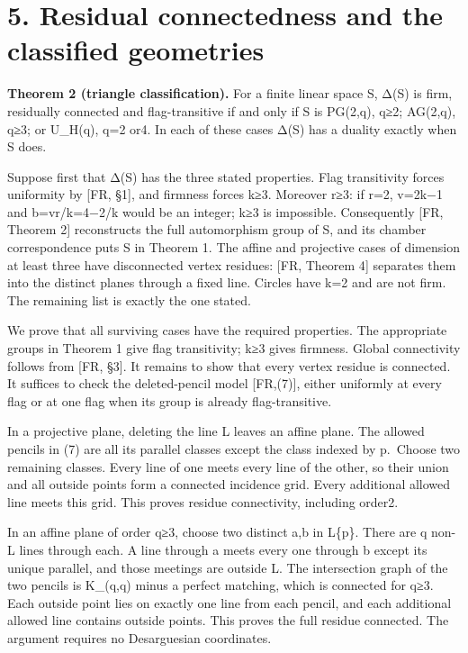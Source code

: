 \documentclass[
  11pt,
  a4paper,
]{article}
\begin{document}
\section{5. Residual connectedness and the classified
geometries}\label{residual-connectedness-and-the-classified-geometries}

\textbf{Theorem 2 (triangle classification).} For a finite linear space
S, Δ(S) is firm, residually connected and flag-transitive if and only if
S is PG(2,q), q≥2; AG(2,q), q≥3; or U\_H(q), q=2 or4. In each of these
cases Δ(S) has a duality exactly when S does.

Suppose first that Δ(S) has the three stated properties. Flag
transitivity forces uniformity by {[}FR, §1{]}, and firmness forces k≥3.
Moreover r≥3: if r=2, v=2k−1 and b=vr/k=4−2/k would be an integer; k≥3
is impossible. Consequently {[}FR, Theorem 2{]} reconstructs the full
automorphism group of S, and its chamber correspondence puts S in
Theorem 1. The affine and projective cases of dimension at least three
have disconnected vertex residues: {[}FR, Theorem 4{]} separates them
into the distinct planes through a fixed line. Circles have k=2 and are
not firm. The remaining list is exactly the one stated.

We prove that all surviving cases have the required properties. The
appropriate groups in Theorem 1 give flag transitivity; k≥3 gives
firmness. Global connectivity follows from {[}FR, §3{]}. It remains to
show that every vertex residue is connected. It suffices to check the
deleted-pencil model {[}FR,(7){]}, either uniformly at every flag or at
one flag when its group is already flag-transitive.

In a projective plane, deleting the line L leaves an affine plane. The
allowed pencils in (7) are all its parallel classes except the class
indexed by p.~Choose two remaining classes. Every line of one meets
every line of the other, so their union and all outside points form a
connected incidence grid. Every additional allowed line meets this grid.
This proves residue connectivity, including order2.

In an affine plane of order q≥3, choose two distinct a,b in L\{p\}.
There are q non-L lines through each. A line through a meets every one
through b except its unique parallel, and those meetings are outside L.
The intersection graph of the two pencils is K\_(q,q) minus a perfect
matching, which is connected for q≥3. Each outside point lies on exactly
one line from each pencil, and each additional allowed line contains
outside points. This proves the full residue connected. The argument
requires no Desarguesian coordinates.
\end{document}
